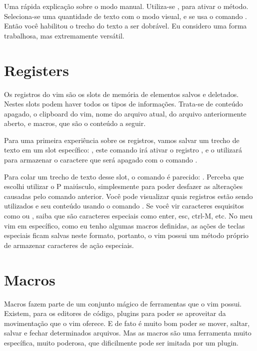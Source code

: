 Uma rápida explicação sobre o modo manual.
Utiliza-se , para ativar o método.
Seleciona-se uma quantidade de texto com o modo visual, e se usa o comando .
Então você habilitou o trecho do texto a ser dobrável.
Eu considero uma forma trabalhosa, mas extremamente versátil.


\section{Registers}
Os registros do vim são os slots de memória de elementos salvos e deletados.
Nestes slots podem haver todos os tipos de informações.
Trata-se de conteúdo apagado, o clipboard do vim, nome do arquivo atual, do arquivo anteriormente aberto,
e macros, que são o conteúdo a seguir.

Para uma primeira experiência sobre os registros, vamos salvar um trecho de texto
em um slot específico: , este comando irá ativar o registro , e
o utilizará para armazenar o caractere que será apagado com o comando .

Para colar um trecho de texto desse slot, o comando é parecido: .
Perceba que escolhi utilizar o P maiúsculo, simplesmente para poder desfazer as alterações causadas pelo comando anterior.
Você pode visualizar quais registros estão sendo utilizados e seu conteúdo usando o comando .
Se você vir caracteres esquisitos como  ou \vimkeys{\^}, saiba que são caracteres especiais como 
enter, esc, ctrl-M, etc.
No meu vim em específico, como eu tenho algumas macros definidas, as ações de teclas especiais ficam salvas neste formato,
portanto, o vim possui um método próprio de armazenar caracteres de ação especiais.


\section{Macros}
Macros fazem parte de um conjunto mágico de ferramentas que o vim possui.
Existem, para os editores de código, plugins para poder se aproveitar da movimentação que o vim oferece.
E de fato é muito bom poder se mover, saltar, salvar e fechar determinados arquivos.
Mas as macros são uma ferramenta muito específica, muito poderosa, que dificilmente pode ser imitada por um plugin.

